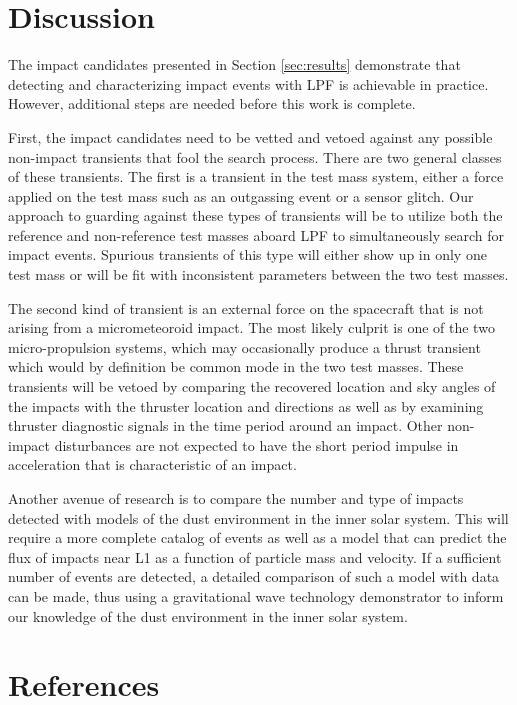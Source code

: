 \documentclass[a4paper]{jpconf}
\begin{document}
\section{Discussion}
\label{sec:discuss}
The impact candidates presented in Section \ref{sec:results} demonstrate that detecting and characterizing impact events with LPF is achievable in practice. However, additional steps are needed before this work is complete. 
\par
First, the impact candidates need to be vetted and vetoed against any possible non-impact transients that fool the search process.  There are two general classes of these transients. The first is a transient in the test mass system, either a force applied on the test mass such as an outgassing event or a sensor glitch. Our approach to guarding against these types of transients will be to utilize both the reference and non-reference test masses aboard LPF to simultaneously search for impact events. Spurious transients of this type will either show up in only one test mass or will be fit with inconsistent parameters between the two test masses.
\par
The second kind of transient is an external force on the spacecraft that is not arising from a micrometeoroid impact. The most likely culprit is one of the two micro-propulsion systems, which may occasionally produce a thrust transient which would by definition be common mode in the two test masses. These transients will be vetoed by comparing the recovered location and sky angles of the impacts with the thruster location and directions as well as by examining  thruster diagnostic signals in the time period around an impact. Other non-impact disturbances are not expected to have the short period impulse in acceleration that is characteristic of an impact. 
\par
Another avenue of research is to compare the number and type of impacts detected with models of the dust environment in the inner solar system. This will require a more complete catalog of events as well as a model that can predict the flux of impacts near L1 as a function of particle mass and velocity. If a sufficient number of events are detected, a detailed comparison of such a model with data can be made, thus using a gravitational wave technology demonstrator to inform our knowledge of the dust environment in the inner solar system.


\section*{References}


\end{document}
